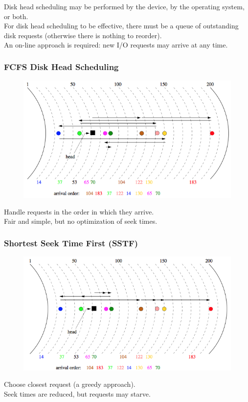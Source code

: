\documentclass[12pt]{article}
\theoremstyle{plain}
\theoremstyle{definition}
\begin{document}
Disk head scheduling may be performed by the device, by the operating system, or both. \\

For disk head scheduling to be effective, there must be a queue of outstanding disk requests (otherwise there is nothing to reorder). \\

An on-line approach is required: new I/O requests may arrive at any time.

\subsubsection{FCFS Disk Head Scheduling}
\begin{figure}[H]
  \centering
  \includegraphics[scale=0.5]{pictures/fcfs_disk.png}
\end{figure}
Handle requests in the order in which they arrive. \\
Fair and simple, but no optimization of seek times.

\subsubsection{Shortest Seek Time First (SSTF)}
\begin{figure}[H]
  \centering
  \includegraphics[scale=0.5]{pictures/sstf_disk.png}
\end{figure}
Choose closest request (a greedy approach). \\
Seek times are reduced, but requests may starve.
\end{document}
